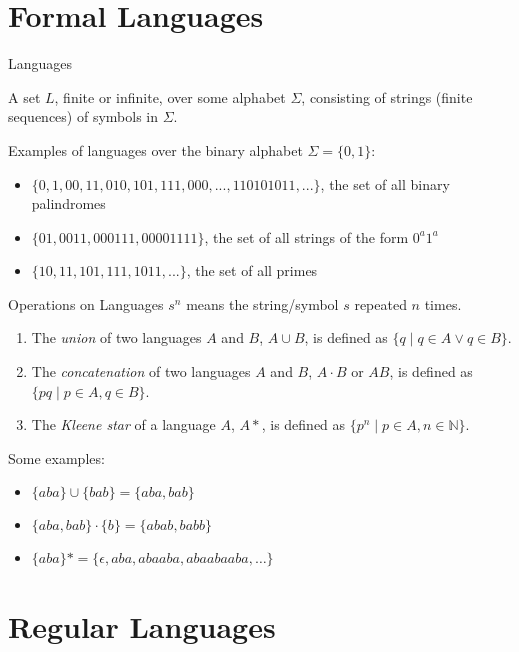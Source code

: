 \documentclass{beamer}
\newcommand{\concat}{\mathbin{\cdot}}
\newcommand{\kstar}{{*}}
\begin{document}
\section{Formal Languages}

\begin{frame}{Languages}
\begin{definition}
A set $L$, finite or infinite, over some alphabet $\Sigma$, consisting of strings (finite sequences) of symbols in $\Sigma$.
\end{definition}

Examples of languages over the binary alphabet $\Sigma = \{0,1\}$:
\begin{itemize}
	\item $\{0,1,00,11,010,101,111,000,...,110101011,...\}$, the set of all binary palindromes
\item $\{01,0011,000111,00001111\}$, the set of all strings of the form $0^a1^a$
\item $\{10,11,101,111,1011,...\}$, the set of all primes
\end{itemize}

\end{frame}

\begin{frame}{Operations on Languages}
$s^n$ means the string/symbol $s$ repeated $n$ times.

\begin{enumerate}
\item The \textit{union} of two languages $A$ and $B$, $A \cup B$, is defined as $\{q \mid q \in A \vee q \in B\}$.
\item The \textit{concatenation} of two languages $A$ and $B$, $A \cdot B$ or $AB$, is defined as $\{pq \mid p \in A, q \in B\}$.
\item The \textit{Kleene star} of a language $A$, $A*$, is defined as $\{p^n \mid p \in A, n \in \mathbb{N}\}$.
\end{enumerate}

Some examples:
\begin{itemize}
\item $\{aba\} \cup \{bab\} = \{aba, bab\}$
\item $\{aba, bab\} \concat \{b\} = \{abab, babb\}$
\item $\{aba\} \kstar = \{\epsilon, aba, abaaba, abaabaaba, \ldots\}$
\end{itemize}
\end{frame}

\section{Regular Languages}
\end{document}
